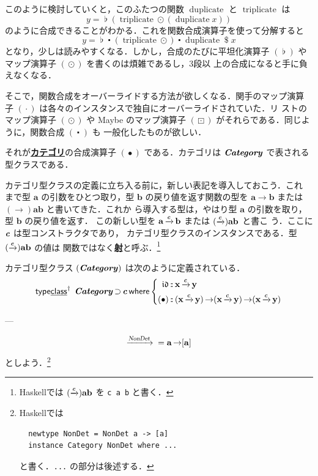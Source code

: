 \documentclass[a5paper,twoside,fleqn,draft]{jsbook}
\newcommand{\programminglanguage}[1]{\textsf{#1}}
\newcommand{\haskell}{\programminglanguage{Haskell}}
\newcommand{\keyword}[1]{{\underline{\textbf{#1}}}}
\newcommand{\code}[1]{\texttt{#1}}
\newcommand{\mKeyword}[1]{\mathsf{#1}}
\newcommand{\mKeywordUnderline}[1]{\text{\underline{\textsf{#1}}}}
\newcommand{\mTypeClassDeclKeyword}{\mKeyword{type}\mKeywordUnderline{class}}
\newcommand{\mWhereKeyword}{\mKeyword{where}}
\newcommand{\mPolymorphic}[1]{{#1}^\dagger}
\DeclareMathOperator{\mSuperSet}{\supset}
\DeclareMathOperator{\mTypeClassDeclPolymorphic}{\mPolymorphic{\mTypeClassDeclKeyword}}
\DeclareMathOperator{\mWhere}{\mWhereKeyword}
\newcommand{\mSpecialFunc}[1]{\mathrm{#1}}
\newcommand{\mVarSpecialFunc}[1]{\mathfrak{#1}}
\DeclareMathOperator{\mDuplicate}{\mSpecialFunc{duplicate}}
\DeclareMathOperator{\mIdCat}{\mVarSpecialFunc{id}}
\DeclareMathOperator{\mTriplicate}{\mSpecialFunc{triplicate}}
\newcommand{\mCatArrow}[1]{\xrightarrow{#1}}
\DeclareMathOperator{\mApply}{\$}
\DeclareMathOperator{\mCatArrowC}{\mCatArrow{\mPolymorphicTypeParameter{c}}}
\DeclareMathOperator{\mCompFunc}{\centerdot}
\DeclareMathOperator{\mCompCat}{\bullet}
\DeclareMathOperator{\mFuncArrow}{\rightarrow}
\DeclareMathOperator{\mIn}{{:\!:}}
\DeclareMathOperator{\mJoinList}{\flat} %
\DeclareMathOperator{\mMap}{\cdot}
\DeclareMathOperator{\mMapList}{\odot}
\DeclareMathOperator{\mMapMaybe}{\boxdot}
\newcommand{\mType}[1]{\mathbf{#1}} %
\newcommand{\mPolymorphicTypeParameter}[1]{\textbf{\textit{#1}}}
\newcommand{\mA}{\mType{a}}
\newcommand{\mB}{\mType{b}}
\newcommand{\mX}{\mType{x}}
\newcommand{\mY}{\mType{y}}
\newcommand{\mTypeConstructor}[1]{\textsl{#1}}
\newcommand{\mTypeClass}[1]{\textbf{\textit{#1}}}
\newcommand{\mCatTypeClass}{\mTypeClass{Category}}
\begin{document}
このように検討していくと，このふたつの関数 $\mDuplicate$ と
$\mTriplicate$ は
\begin{equation}
  y
  =\mJoinList(\mTriplicate\mMapList{}(\mDuplicate x))
\end{equation}
のように合成できることがわかる．これを関数合成演算子を使って分解すると
\begin{equation}
  \label{eq:triplicate-duplicate}
  y
  =\mJoinList\mCompFunc{}(\mTriplicate\mMapList)\mCompFunc\mDuplicate\mApply x
\end{equation}
となり，少しは読みやすくなる．しかし，合成のたびに平坦化演算子
$(\mJoinList)$ やマップ演算子 $(\mMapList)$ を書くのは煩雑であるし，3段以
上の合成になると手に負えなくなる．

そこで，関数合成をオーバーライドする方法が欲しくなる．関手のマップ演算
子 $(\mMap)$ は各々のインスタンスで独自にオーバーライドされていた．リ
ストのマップ演算子 $(\mMapList)$ や Maybe のマップ演算子
$(\mMapMaybe)$ がそれらである．同じように，関数合成 $(\mCompFunc)$ も
一般化したものが欲しい．

それが\keyword{カテゴリ}の合成演算子 $(\mCompCat)$ である．カテゴリは
$\mCatTypeClass$ で表される型クラスである．

カテゴリ型クラスの定義に立ち入る前に，新しい表記を導入しておこう．これ
まで型 $\mA$ の引数をひとつ取り，型 $\mB$ の戻り値を返す関数の型を
$\mA\mFuncArrow\mB$ または $(\mFuncArrow)\mA\mB$ と書いてきた．これか
ら導入する型は，やはり型 $\mA$ の引数を取り，型 $\mB$ の戻り値を返す．
この新しい型を $\mA\mCatArrowC\mB$ または $(\mCatArrowC)\mA\mB$ と書こ
う．ここに $\mPolymorphicTypeParameter{c}$ は型コンストラクタであり，
カテゴリ型クラスのインスタンスである．型 $(\mCatArrowC)\mA\mB$ の値は
関数ではなく\keyword{射}と呼ぶ．\footnote{\haskell では
  $(\mCatArrowC)\mA\mB$ を \code{c a b} と書く．}

カテゴリ型クラス $(\mCatTypeClass)$ は次のように定義されている．
\begin{equation}
  \mTypeClassDeclPolymorphic\;
  \mCatTypeClass\mSuperSet\mPolymorphicTypeParameter{c}
  \mWhere\left\{
  \begin{aligned}
    \mIdCat
    &\mIn\mX\mCatArrowC\mY\\
    (\mCompCat)
    &\mIn{}(\mX\mCatArrowC\mY)\mFuncArrow(\mX\mCatArrowC\mY)\mFuncArrow(\mX\mCatArrowC\mY)
  \end{aligned}
  \right.
\end{equation}

---

\begin{equation}
  \mCatArrow{\mTypeConstructor{NonDet}}{}
  =\mA\mFuncArrow[\mA]
\end{equation}
としよう．\footnote{\haskell では
\begin{verbatim}
  newtype NonDet = NonDet a -> [a]
  instance Category NonDet where ...
\end{verbatim}
と書く．\code{...} の部分は後述する．}
\end{document}
